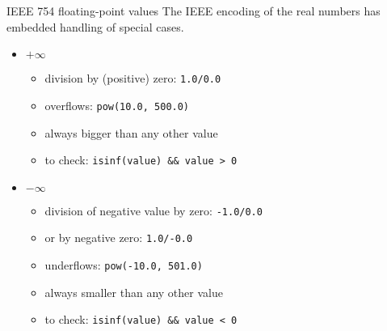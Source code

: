\documentclass[aspectratio=169,14pt]{beamer}
\begin{document}
\begin{frame}{IEEE 754 floating-point values}
The IEEE encoding of the real numbers has embedded handling of special cases.

\begin{itemize}
    \item \( + \infty \)
    \begin{itemize}
        \item division by (positive) zero: \texttt{1.0/0.0}
        \item overflows: \texttt{pow(10.0, 500.0)}
        \item always bigger than any other value
        \item to check: \texttt{isinf(value) \&\& value > 0}
    \end{itemize}

    \item \( - \infty \)
    \begin{itemize}
        \item division of negative value by zero: \texttt{-1.0/0.0}
        \item or by negative zero: \texttt{1.0/-0.0}
        \item underflows: \texttt{pow(-10.0, 501.0)}
        \item always smaller than any other value
        \item to check: \texttt{isinf(value) \&\& value < 0}
    \end{itemize}
\end{itemize}
\end{frame}
\end{document}
